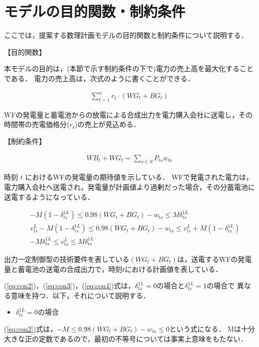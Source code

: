 \documentclass[a4paper,12pt,showkeys]{jreport}
\begin{document}
\section{モデルの目的関数・制約条件}

ここでは，提案する数理計画モデルの目的関数と制約条件について説明する．

【目的関数】

本モデルの目的は，(本節で示す制約条件の下で)電力の売上高を最大化することである．
電力の売上高は，次式のように書くことができる．

\begin{eqnarray}
\sum_{t = 1}^n r_t \cdot (WG_t + BG_t)
\label{eq:obuj}
\end{eqnarray}

WFの発電量と蓄電池からの放電による合成出力を電力購入会社に送電し，その時間帯の売電価格分($r_t$)の売上が見込める．

【制約条件】

\begin{eqnarray}
WB_t + WG_t = \sum_{s \in S} P_{ts} w_{ts}
\label{eq:con1}
\end{eqnarray}

時刻 $t$ におけるWFの発電量の期待値を示している．
WFで発電された電力は，電力購入会社へ送電され，発電量が計画値より過剰だった場合，その分蓄電池に送電するようになっている．

\begin{eqnarray}
&& - M (1 - \delta^{1L}_{ts})  \le 0.98 (WG_t + BG_t) - w_{ts}  \le M \delta^{1L}_{ts}
\label{eq:con2} \\
&& v^L_{ts} - M (1 - \delta^{1L}_{ts}) \le 0.98 (WG_t + BG_t) - w_{ts} \le v^L_{ts} + M (1 - \delta^{1L}_{ts})
\label{eq:con3} \\
&& - M \delta^{1L}_{ts} \le v^L_{ts} \le M \delta^{1L}_{ts}
\label{eq:con4}
\end{eqnarray}


出力一定制御型の技術要件を表している$(WG_t + BG_t)$は，送電するWFの発電量と蓄電池の送電の合成出力で，時刻$t$における計画値を表している．

(\ref{eq:con2})，(\ref{eq:con3})，(\ref{eq:con4})式は，$\delta^{1L}_{ts}$$=0$の場合と$\delta^{1L}_{ts}$$=1$の場合で
異なる意味を持つ．以下，それについて説明する．

\begin{itemize}
\item $\delta^{1L}_{ts}$$=0$の場合
\end{itemize}

(\ref{eq:con2})式は，$-M \le 0.98 (WG_t + BG_t) - w_{ts} \le 0$という式になる．
Mは十分大きな正の定数であるので，最初の不等号については事実上意味をもたない．
\end{document}
